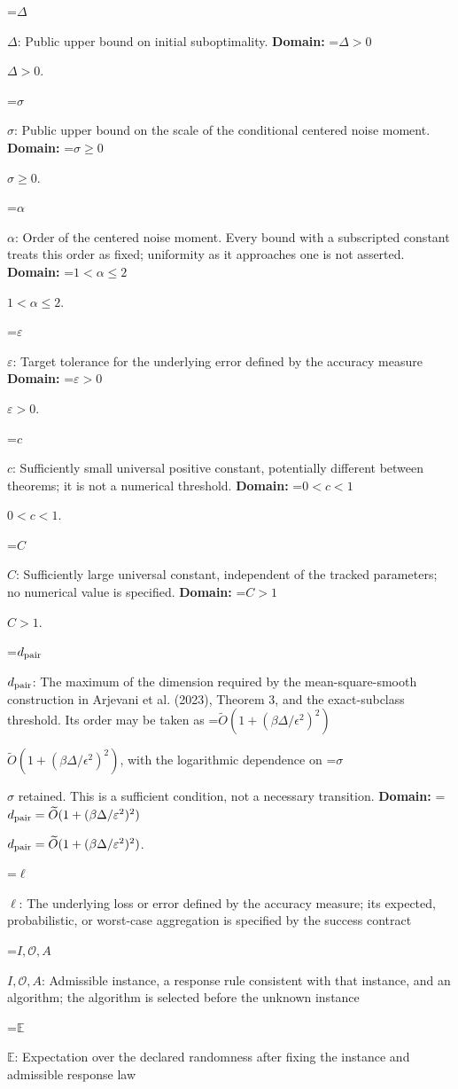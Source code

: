 \documentclass[10pt,a4paper]{article}
\newcommand{\AtlasMath}[1]{\par\begingroup\centering\setbox0=\hbox{$\displaystyle #1$}\ifdim\wd0>1.4\linewidth\typeout{ATLAS WIDE FORMULA: \the\wd0}\fi\ifdim\wd0>\linewidth\resizebox{\linewidth}{!}{\box0}\else\box0\fi\par\endgroup}
\newcommand{\AtlasInlineMath}[1]{\begingroup\setbox0=\hbox{$#1$}\ifdim\wd0>.4\linewidth\endgroup\AtlasMath{#1}\else\endgroup$#1$\fi}
\begin{document}
\AtlasInlineMath{\Delta}: Public upper bound on initial suboptimality. \textbf{Domain:} \AtlasInlineMath{\Delta>0}.



\AtlasInlineMath{\sigma}: Public upper bound on the scale of the conditional centered noise moment. \textbf{Domain:} \AtlasInlineMath{\sigma\ge0}.



\AtlasInlineMath{\alpha}: Order of the centered noise moment. Every bound with a subscripted constant treats this order as fixed; uniformity as it approaches one is not asserted. \textbf{Domain:} \AtlasInlineMath{1<\alpha\le2}.



\AtlasInlineMath{\varepsilon}: Target tolerance for the underlying error defined by the accuracy measure \textbf{Domain:} \AtlasInlineMath{\varepsilon>0}.



\AtlasInlineMath{c}: Sufficiently small universal positive constant, potentially different between theorems; it is not a numerical threshold. \textbf{Domain:} \AtlasInlineMath{0<c<1}.



\AtlasInlineMath{C}: Sufficiently large universal constant, independent of the tracked parameters; no numerical value is specified. \textbf{Domain:} \AtlasInlineMath{C>1}.



\AtlasInlineMath{d_{\rm pair}}: The maximum of the dimension required by the mean-square-smooth construction in Arjevani et al. (2023), Theorem 3, and the exact-subclass threshold. Its order may be taken as \AtlasInlineMath{\widetilde O(1+(\beta\Delta/\epsilon^2)^2)}, with the logarithmic dependence on \AtlasInlineMath{\sigma} retained. This is a sufficient condition, not a necessary transition. \textbf{Domain:} \AtlasInlineMath{d_{\rm pair}=\widetilde{O}(1+(\beta\Delta/\varepsilon^2)^2)}.



\AtlasInlineMath{\ell}: The underlying loss or error defined by the accuracy measure; its expected, probabilistic, or worst-case aggregation is specified by the success contract



\AtlasInlineMath{I,\mathcal{O},A}: Admissible instance, a response rule consistent with that instance, and an algorithm; the algorithm is selected before the unknown instance



\AtlasInlineMath{\mathbb{E}}: Expectation over the declared randomness after fixing the instance and admissible response law
\end{document}
